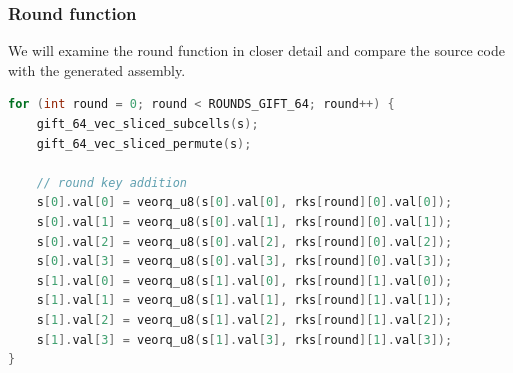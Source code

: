 \subsubsection{Round function}
We will examine the round function in closer detail and compare the source code
with the generated assembly.

\begin{lstlisting}[language=c, caption={Round function}]
for (int round = 0; round < ROUNDS_GIFT_64; round++) {
    gift_64_vec_sliced_subcells(s);
    gift_64_vec_sliced_permute(s);

    // round key addition
    s[0].val[0] = veorq_u8(s[0].val[0], rks[round][0].val[0]);
    s[0].val[1] = veorq_u8(s[0].val[1], rks[round][0].val[1]);
    s[0].val[2] = veorq_u8(s[0].val[2], rks[round][0].val[2]);
    s[0].val[3] = veorq_u8(s[0].val[3], rks[round][0].val[3]);
    s[1].val[0] = veorq_u8(s[1].val[0], rks[round][1].val[0]);
    s[1].val[1] = veorq_u8(s[1].val[1], rks[round][1].val[1]);
    s[1].val[2] = veorq_u8(s[1].val[2], rks[round][1].val[2]);
    s[1].val[3] = veorq_u8(s[1].val[3], rks[round][1].val[3]);
}
\end{lstlisting}

